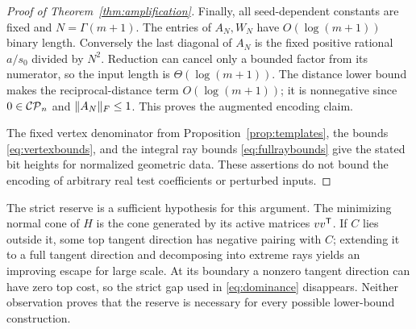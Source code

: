 \begin{proof}[Proof of Theorem~\ref{thm:amplification}]
Finally, all seed-dependent constants are fixed and $N=\Gamma(m+1)$. The entries of $A_N,W_N$ have $O(\log(m+1))$ binary length. Conversely the last diagonal of $A_N$ is the fixed positive rational $a/s_0$ divided by $N^2$. Reduction can cancel only a bounded factor from its numerator, so the input length is $\Theta(\log(m+1))$. The distance lower bound makes the reciprocal-distance term $O(\log(m+1))$; it is nonnegative since $0\in\mathcal{CP}_n$ and $\lVert A_N\rVert_F\le1$. This proves the augmented encoding claim.

The fixed vertex denominator from Proposition~\ref{prop:templates}, the bounds \eqref{eq:vertexbounds}, and the integral ray bounds \eqref{eq:fullraybounds} give the stated bit heights for normalized geometric data. These assertions do not bound the encoding of arbitrary real test coefficients or perturbed inputs.
\end{proof}

The strict reserve is a sufficient hypothesis for this argument. The minimizing normal cone of $H$ is the cone generated by its active matrices $vv^{\mathsf T}$. If $C$ lies outside it, some top tangent direction has negative pairing with $C$; extending it to a full tangent direction and decomposing into extreme rays yields an improving escape for large scale. At its boundary a nonzero tangent direction can have zero top cost, so the strict gap used in \eqref{eq:dominance} disappears. Neither observation proves that the reserve is necessary for every possible lower-bound construction.
